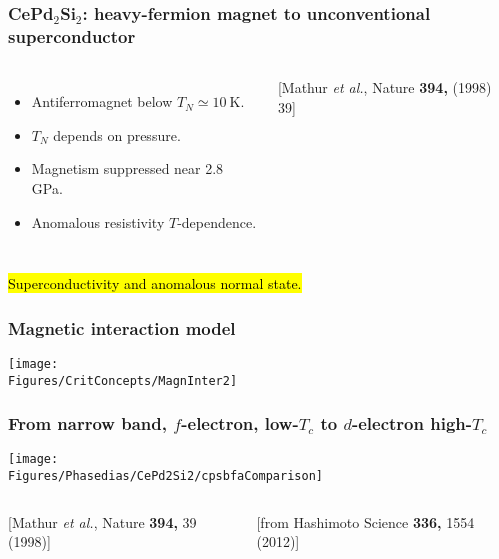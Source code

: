 \begin{frame}[label=CPS]
\frametitle{CePd$_2$Si$_2$: heavy-fermion magnet to unconventional superconductor}
\begin{columns}[t]
  \begin{itemize}
  \item<1-> Antiferro\-magnet below $T_N\simeq 10 ~\mathrm K$.

  \item<1-> $T_N$ depends on pressure.

  \item<1->  Magnetism suppressed near 2.8 GPa.

  \item<1-> Anomalous resistivity $T$-dependence.
  \end{itemize}

\vspace{1em}
\centerline{\scriptsize [Mathur {\em et al.}, Nature {\bf 394,} (1998) 39]}
\vspace{0em}
  \centerline{}
 
\end{columns}
\begin{center}
\hl{Superconductivity and anomalous normal state.}
\end{center}
\end{frame}


\begin{frame}[label=ThreshMagn]
\frametitle{Magnetic interaction model}

\centerline{\texttt{[image: \\Figures/CritConcepts/MagnInter2]}}

\end{frame}



\begin{frame}[label=CPS]
\frametitle{From narrow band, $f$-electron, low-$T_c$ to
  $d$-electron high-$T_c$}
\centerline{\texttt{[image: \\Figures/Phasedias/CePd2Si2/cpsbfaComparison]}}

\begin{columns}[t]
\centerline{\scriptsize \hspace{5em} [Mathur {\em et al.}, Nature {\bf 394,} 39  (1998)]}

\centerline{\scriptsize [from Hashimoto Science {\bf 336,} 1554 (2012)]}
\end{columns}
\end{frame}

